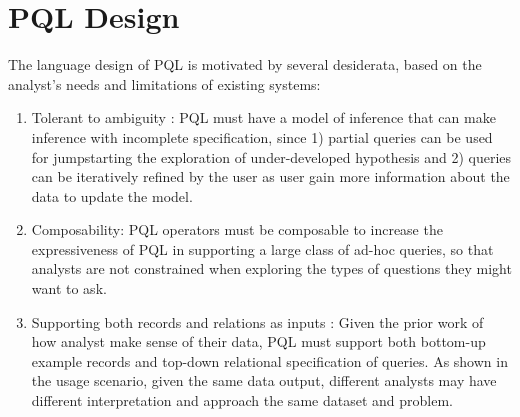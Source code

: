 \documentclass{sig-alternate-05-2015}
\begin{document}
\section{PQL Design}
The language design of PQL is motivated by several desiderata, based on the analyst's needs and limitations of existing systems:
\begin{enumerate}
	\item Tolerant to ambiguity : PQL must have a model of inference that can make inference with incomplete specification, since 1) partial queries can be used for jumpstarting the exploration of under-developed hypothesis and 2) queries can be iteratively refined by the user as user gain more information about the data to update the model. 
	\item Composability: PQL operators must be composable to increase the expressiveness of PQL in supporting a large class of ad-hoc queries, so that analysts are not constrained when exploring the types of questions they might want to ask.
	\item Supporting both records and relations as inputs : Given the prior work of how analyst make sense of their data\cite{Pirolli2005,Klein2006}, PQL must support both bottom-up example records and top-down relational specification of queries. As shown in the usage scenario, given the same data output, different analysts may have different interpretation and approach the same dataset and problem. %
\end{enumerate}
\end{document}
